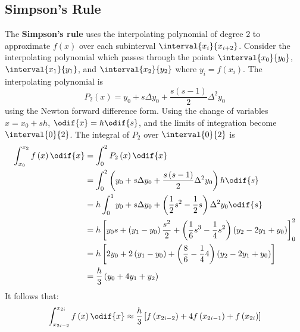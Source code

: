 \documentclass{article}
\begin{document}
\subsection{Simpson's Rule}
The \textbf{Simpson's rule} uses the interpolating polynomial of degree
2 to approximate \(f\left( x \right)\) over each subinterval
\(\interval{x_i}{x_{i + 2}}\). Consider the interpolating polynomial
which passes through the points \(\interval{x_0}{y_0}\),
\(\interval{x_1}{y_1}\), and \(\interval{x_2}{y_2}\) where \(y_i =
f\left( x_i \right)\). The interpolating polynomial is
\begin{equation*}
    P_2\left( x \right) = y_0 + s \Delta{y_0} + \frac{s\left( s - 1 \right)}{2} \Delta^2{y_0}
\end{equation*}
using the Newton forward difference form. Using the change of variables
\(x = x_0 + s h\), \(\odif{x} = h \odif{s}\), and the limits of
integration become \(\interval{0}{2}\). The integral of \(P_2\) over
\(\interval{0}{2}\) is
\begin{align*}
    \int_{x_0}^{x_2} f\left( x \right) \odif{x} & = \int_0^2 P_2\left( x \right) \odif{x}                                                                                                                  \\
                                                & = \int_0^2 \left( y_0 + s \Delta{y_0} + \frac{s\left( s - 1 \right)}{2} \Delta^2{y_0} \right) h \odif{s}                                                 \\
                                                & = h \int_0^1 y_0 + s \Delta{y_0} + \left( \frac{1}{2} s^2 - \frac{1}{2} s \right) \Delta^2{y_0} \odif{s}                                                 \\
                                                & = h \left[ y_0 s + \left( y_1 - y_0 \right) \frac{s^2}{2} + \left( \frac{1}{6} s^3 - \frac{1}{4} s^2 \right) \left( y_2 - 2y_1 + y_0 \right) \right]_0^2 \\
                                                & = h \left[ 2 y_0 + 2 \left( y_1 - y_0 \right) + \left( \frac{8}{6} - \frac{1}{4} 4 \right) \left( y_2 - 2y_1 + y_0 \right) \right]                       \\
                                                & = \frac{h}{3} \left( y_0 + 4 y_1 + y_2 \right)
\end{align*}
It follows that:
\begin{equation*}
    \int_{x_{2i - 2}}^{x_{2i}} f\left( x \right) \odif{x} \approx \frac{h}{3} \left[ f\left( x_{2i - 2} \right) + 4f\left( x_{2i - 1} \right) + f\left( x_{2i} \right) \right]
\end{equation*}
\end{document}
